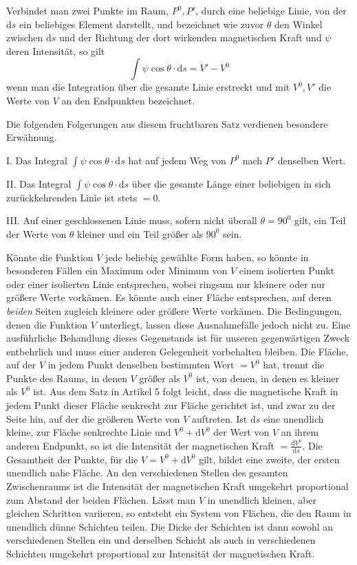 Verbindet man zwei Punkte im Raum, $P^0,P'$, durch eine beliebige Linie, von der $\mathrm{d}s$ ein beliebiges Element darstellt, und bezeichnet wie zuvor $\theta$ den Winkel zwischen $\mathrm{d}s$ und der Richtung der dort wirkenden magnetischen Kraft und $\psi$ deren Intensität, so gilt
\[
\int\psi\cos\theta\cdot\mathrm{d}s=V'-V^0
\]
wenn man die Integration über die gesamte Linie erstreckt und mit $V^0,V'$ die Werte von $V$ an den Endpunkten bezeichnet.

Die folgenden Folgerungen aus diesem fruchtbaren Satz verdienen besondere Erwähnung.

I. Das Integral $\int\psi\cos\theta\cdot\mathrm{d}s$ hat auf jedem Weg von $P^0$ nach $P'$ denselben Wert.

II. Das Integral $\int\psi\cos\theta\cdot\mathrm{d}s$ über die gesamte Länge einer beliebigen in sich zurückkehrenden Linie ist stets $=0$.

III. Auf einer geschlossenen Linie muss, sofern nicht überall $\theta=90^0$ gilt, ein Teil der Werte von $\theta$ kleiner und ein Teil größer als $90^0$ sein.

\expandafter\def\csname HistoricalNoteText15\endcsname{Könnte die Funktion $V$ jede beliebig gewählte Form haben, so könnte in besonderen Fällen ein Maximum oder Minimum von $V$ einem isolierten Punkt oder einer isolierten Linie entsprechen, wobei ringsum nur kleinere oder nur größere Werte vorkämen. Es könnte auch einer Fläche entsprechen, auf deren \textit{beiden} Seiten zugleich kleinere oder größere Werte vorkämen. Die Bedingungen, denen die Funktion $V$ unterliegt, lassen diese Ausnahmefälle jedoch nicht zu. Eine ausführliche Behandlung dieses Gegenstands ist für unseren gegenwärtigen Zweck entbehrlich und muss einer anderen Gelegenheit vorbehalten bleiben.}
Die Fläche, auf der $V$ in jedem Punkt denselben bestimmten Wert $=V^0$ hat, trennt die Punkte des Raums, in denen $V$ größer als $V^0$ ist, von denen, in denen es kleiner als $V^0$ ist. Aus dem Satz in Artikel 5 folgt leicht, dass die magnetische Kraft in jedem Punkt dieser Fläche senkrecht zur Fläche gerichtet ist, und zwar zu der Seite hin, auf der die größeren Werte von $V$ auftreten. Ist $\mathrm{d}s$ eine unendlich kleine, zur Fläche senkrechte Linie und $V^0+\mathrm{d}V^0$ der Wert von $V$ an ihrem anderen Endpunkt, so ist die Intensität der magnetischen Kraft $=\frac{\mathrm{d}V^0}{\mathrm{d}s}$. Die Gesamtheit der Punkte, für die $V=V^0+\mathrm{d}V^0$ gilt, bildet eine zweite, der ersten unendlich nahe Fläche. An den verschiedenen Stellen des gesamten Zwischenraums ist die Intensität der magnetischen Kraft umgekehrt proportional zum Abstand der beiden Flächen. Lässt man $V$ in unendlich kleinen, aber gleichen Schritten variieren, so entsteht ein System von Flächen, die den Raum in unendlich dünne Schichten teilen. Die Dicke der Schichten ist dann sowohl an verschiedenen Stellen ein und derselben Schicht als auch in verschiedenen Schichten umgekehrt proportional zur Intensität der magnetischen Kraft.

